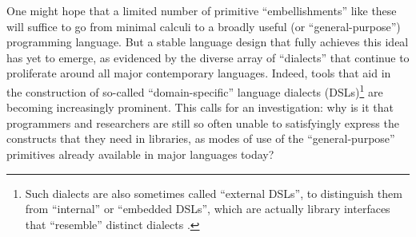 One might hope that a limited number of primitive ``embellishments'' like these will suffice to go from minimal calculi to a broadly useful (or ``general-purpose'') programming language.  But a stable language design that fully achieves this ideal has yet to emerge, as evidenced by the diverse array of ``dialects'' that continue to proliferate around all major contemporary languages. %
Indeed, tools that aid in the construction of so-called  ``domain-specific'' language dialects (DSLs)\footnote{Such dialects are also sometimes called ``external DSLs'', to distinguish them from  ``internal'' or ``embedded DSLs'', which are actually  library interfaces that  ``resemble'' distinct dialects \cite{fowler2010domain}.} are becoming increasingly prominent.
{This calls for an investigation}: why is it that programmers and researchers are still so often unable to satisfyingly express the constructs that they need in libraries, as modes of use of the ``general-purpose'' primitives already available in major languages today?

